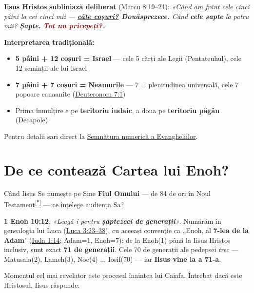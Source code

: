 \documentclass[12pt,a4paper,twoside,openany]{book}
\begin{document}
\hypertarget{pesti-cosuri}{}
\begin{contextbox}
\textbf{Iisus Hristos} \textbf{\underline{subliniază deliberat}} (\href{https://bibliaortodoxa.ro/carte.php?id=53\&cap=8\#19}{Marcu 8:19–21}): \textit{«Când am frânt cele cinci pâini la cei cinci mii — \textbf{\underline{câte coșuri?} Douăsprezece.} Când \textbf{cele șapte} la patru mii? \textbf{Șapte.} \textcolor{darkred}{\textbf{Tot nu pricepeți?}}»}
\end{contextbox}
\textbf{Interpretarea tradițională:}

\begin{itemize}
  \item \textbf{5 pâini + 12 coșuri = Israel} — cele 5 cărți ale Legii (Pentateuhul), cele 12 seminții ale lui Israel
  \item \textbf{7 pâini + 7 coșuri = Neamurile} — 7 = plenitudinea universală, cele 7 popoare canaanite (\href{https://bibliaortodoxa.ro/carte.php?id=17\&cap=7\#1}{Deuteronom 7:1})
  \item Prima înmulțire e pe \textbf{teritoriu iudaic}, a doua pe \textbf{teritoriu păgân} (Decapole)
\end{itemize}
Pentru detalii sari direct la \hyperref[semnatura]{Semnătura numerică a Evangheliilor}.


\chapter{De ce contează Cartea lui Enoh?}\label{de-ce-enoh}
Când Iisus Se numește pe Sine \textbf{Fiul Omului} — de 84 de ori în Noul Testament\href{\#nota-84}{\textsuperscript{[*]}} — ce înțelege audiența Sa?


\begin{contextbox}
\textbf{1 Enoh 10:12}, \textit{«Leagă-i pentru \textbf{șaptezeci de generații}»}. Numărăm în genealogia lui Luca (\href{https://bibliaortodoxa.ro/carte.php?id=48\&cap=3\#23}{Luca 3:23–38}), cu aceeași convenție ca „Enoh, al \textbf{7-lea de la Adam}" (\href{https://bibliaortodoxa.ro/carte.php?id=44\&cap=1\#14}{Iuda 1:14}; Adam=1, Enoh=7): de la Enoh(1) până la Iisus Hristos inclusiv, sunt exact \textbf{71 de generații}. Cele 70 de generații ale pedepsei \textit{trec} — Matusala(2), Lameh(3), Noe(4) ... Iosif(70) — iar \textbf{Iisus vine la a 71-a}.
\end{contextbox}
Momentul cel mai revelator este procesul înaintea lui Caiafa. Întrebat dacă este Hristosul, Iisus răspunde:
\end{document}
